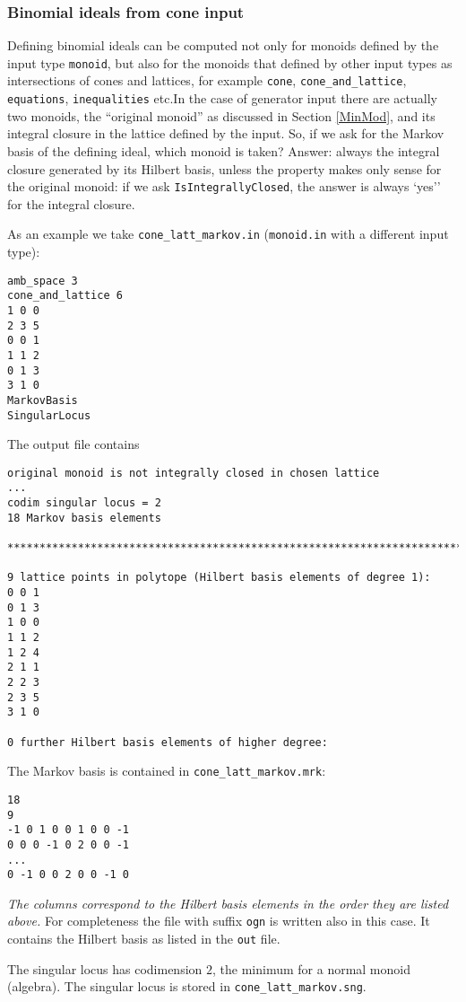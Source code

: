 \subsubsection{Binomial ideals from cone input}

Defining binomial ideals can be computed not only for monoids defined by the input type \verb|monoid|, but also for the monoids that defined by other input types as intersections of cones and lattices, for example \verb|cone|, \verb|cone_and_lattice|, \verb|equations|, \verb|inequalities| etc.In the case of generator input there are actually two monoids, the ``original monoid'' as discussed in Section \ref{MinMod}, and its integral closure in the lattice defined by the input. So, if we ask for the Markov basis of the defining ideal, which monoid is taken? Answer: always the integral closure generated by its Hilbert basis, unless the property makes only sense for the original monoid: if we ask \verb|IsIntegrallyClosed|, the answer is always `yes''  for the integral closure.

As an example we take \verb|cone_latt_markov.in| (\verb|monoid.in| with a different input type):
\begin{Verbatim}
amb_space 3
cone_and_lattice 6
1 0 0
2 3 5
0 0 1
1 1 2
0 1 3
3 1 0
MarkovBasis
SingularLocus
\end{Verbatim}

The output file contains
\begin{Verbatim}
original monoid is not integrally closed in chosen lattice
...
codim singular locus = 2
18 Markov basis elements

***********************************************************************

9 lattice points in polytope (Hilbert basis elements of degree 1):
0 0 1
0 1 3
1 0 0
1 1 2
1 2 4
2 1 1
2 2 3
2 3 5
3 1 0

0 further Hilbert basis elements of higher degree:
\end{Verbatim}
The Markov basis is contained in \verb|cone_latt_markov.mrk|:
\begin{Verbatim}
18
9
-1 0 1 0 0 1 0 0 -1 
0 0 0 -1 0 2 0 0 -1 
...
0 -1 0 0 2 0 0 -1 0 
\end{Verbatim}
\emph{The columns correspond to the Hilbert basis elements in the order they are listed above.} For completeness the file with suffix \verb|ogn| is written also in this case. It contains the Hilbert basis as listed in the \verb|out| file.

The singular locus has codimension $2$, the minimum for a normal monoid (algebra). The singular locus is stored in \verb|cone_latt_markov.sng|.

